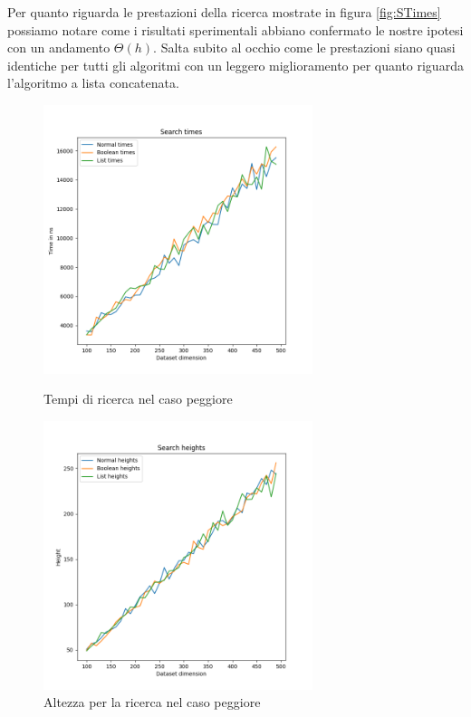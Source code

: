 Per quanto riguarda le prestazioni della ricerca mostrate in figura \ref{fig:STimes} possiamo notare come i risultati sperimentali abbiano confermato le nostre
ipotesi con un andamento $\Theta(h)$.
Salta subito al occhio come le prestazioni siano quasi identiche per tutti gli algoritmi con un leggero miglioramento per quanto riguarda l'algoritmo a lista concatenata.

\begin{figure}[H]
  \centering
  \begin{minipage}{.5\textwidth}
    \centering
    \includegraphics[width=0.7\textwidth]{Resources/ABR_Resources/WorstSearchTimes.png}
    \caption{Tempi di ricerca nel caso peggiore}
    \label{fig:WSTimes}
  \end{minipage}%
  \hfil %
  \begin{minipage}{.5\textwidth}
    \centering
    \includegraphics[width=0.7\textwidth]{Resources/ABR_Resources/WorstSearchHeights.png}
    \caption{Altezza per la ricerca nel caso peggiore}
    \label{fig:WSHeights}
  \end{minipage}%
\end{figure}

